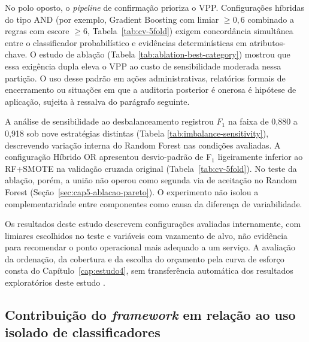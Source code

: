No polo oposto, o \textit{pipeline} de confirmação prioriza o VPP. Configurações híbridas do tipo AND (por exemplo, Gradient Boosting com limiar $\geq 0{,}6$ combinado a regras com escore $\geq 6$, Tabela~\ref{tab:cv-5fold}) exigem concordância simultânea entre o classificador probabilístico e evidências determinísticas em atributos-chave. O estudo de ablação (Tabela \ref{tab:ablation-best-category}) mostrou que essa exigência dupla eleva o VPP ao custo de sensibilidade moderada nessa partição. O uso desse padrão em ações administrativas, relatórios formais de encerramento ou situações em que a auditoria posterior é onerosa é hipótese de aplicação, sujeita à ressalva do parágrafo seguinte.

A análise de sensibilidade ao desbalanceamento registrou $F_1$ na faixa de 0,880 a 0,918 sob nove estratégias distintas (Tabela \ref{tab:imbalance-sensitivity}), descrevendo variação interna do Random Forest nas condições avaliadas. A configuração Híbrido OR apresentou desvio-padrão de F$_1$ ligeiramente inferior ao RF+SMOTE na validação cruzada original (Tabela~\ref{tab:cv-5fold}). No teste da ablação, porém, a união não operou como segunda via de aceitação no Random Forest (Seção~\ref{sec:cap5-ablacao-pareto}). O experimento não isolou a complementaridade entre componentes como causa da diferença de variabilidade.

Os resultados deste estudo descrevem configurações avaliadas internamente, com limiares escolhidos no teste e variáveis com vazamento de alvo, não evidência para recomendar o ponto operacional mais adequado a um serviço. A avaliação da ordenação, da cobertura e da escolha do orçamento pela curva de esforço consta do Capítulo~\ref{cap:estudo4}, sem transferência automática dos resultados exploratórios deste estudo \cite{Jardim2026phdrepo}.

\subsection{Contribuição do \textit{framework} em relação ao uso isolado de classificadores}\label{sec:e3-contribuicao-framework}

